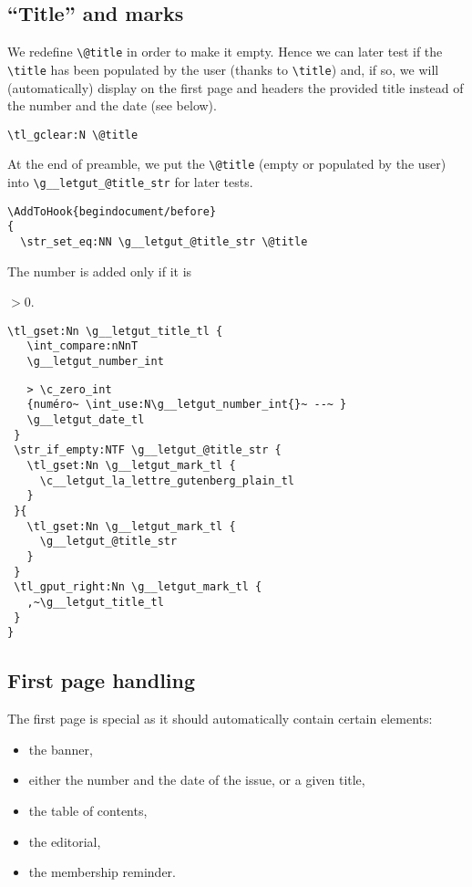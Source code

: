 \documentclass{letgut}
\begin{document}
\subsection{“Title” and marks}
\label{ImplementationTitleandmarks-5ylg55h0jlj0}
We redefine \lstinline+\@title+ in order to make it empty. Hence we can later test if
the \lstinline+\title+ has been populated by the user (thanks to \lstinline+\title+) and, if so,
we will (automatically) display on the first page and headers the provided
title instead of the number and the date (see below).
\begin{lstlisting}
\tl_gclear:N \@title
\end{lstlisting}

At the end of preamble, we put the \lstinline+\@title+ (empty or populated by the
user) into \lstinline+\g__letgut_@title_str+ for later tests.
\begin{lstlisting}
\AddToHook{begindocument/before}
{
  \str_set_eq:NN \g__letgut_@title_str \@title
\end{lstlisting}

The number is added only if it is

\(>0\).

\begin{lstlisting}
\tl_gset:Nn \g__letgut_title_tl {
   \int_compare:nNnT
   \g__letgut_number_int
\end{lstlisting}

\begin{lstlisting}
   > \c_zero_int
   {numéro~ \int_use:N\g__letgut_number_int{}~ --~ }
   \g__letgut_date_tl
 }
 \str_if_empty:NTF \g__letgut_@title_str {
   \tl_gset:Nn \g__letgut_mark_tl {
     \c__letgut_la_lettre_gutenberg_plain_tl
   }
 }{
   \tl_gset:Nn \g__letgut_mark_tl {
     \g__letgut_@title_str
   }
 }
 \tl_gput_right:Nn \g__letgut_mark_tl {
   ,~\g__letgut_title_tl
 }
}
\end{lstlisting}

\subsection{First page handling}
\label{ImplementationFirstpagehandling-nmmg55h0jlj0}
The first page is special as it should automatically contain certain elements:
\begin{itemize}
\item the banner,
\item either the number and the date of the issue, or a given title,
\item the table of contents,
\item the editorial,
\item the membership reminder.
\end{itemize}
\end{document}

